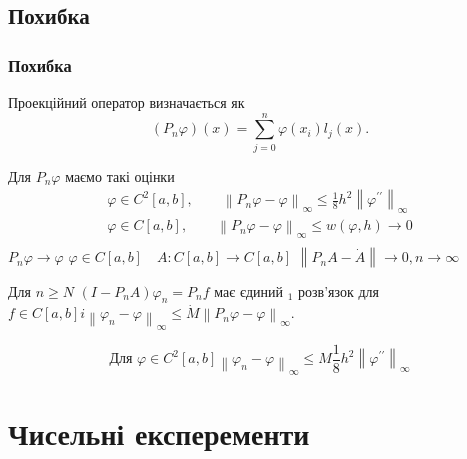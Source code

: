 \documentclass{beamer}
\numberwithin{equation}{section}
\begin{document}
	
	\subsection{Похибка}	
	\begin{frame}
		\frametitle{Похибка}
		
		Проекційний оператор визначається як 
		$$
		\left(P_{n} \varphi\right)(x)= \sum_{j=0}^{n} \varphi\left(x_{i}\right) l_{j}(x) .
		$$
		
		Для $P_{n} \varphi$ маємо такі оцінки 
		$$
		\begin{array}{l}
			\displaystyle
			\varphi \in C^{2}[a, b], \quad \quad \left\|P_{n} \varphi-\varphi\right\|_{\infty} \leq \frac{1}{8} h^{2}\left\|\varphi^{\prime \prime}\right\|_{\infty}  
			\\[0.3cm]
			
			\displaystyle
			\varphi \in C[a, b], \quad \quad \left\|P_{n} \varphi-\varphi\right\|_{\infty} \leq w(\varphi, h) \rightarrow 0
			\\[0.3cm]	
		\end{array}
		$$
		$P_{n} \varphi \rightarrow \varphi$ $\varphi \in C[a, b] \quad A: C[a, b] \rightarrow C[a, b]$  $\left\|P_{n} A-\dot{A}\right\| \rightarrow 0, n \rightarrow \infty$ 
		
		Для $n \geq N$ $\left(I-P_{n} A\right) \varphi_{n}=P_{n} f$ має єдиний $_{1}$ розв'язок для $f \in C[a, b] i\left\|\varphi_{n}-\varphi\right\|_{\infty} \leq \dot{M}\left\|P_{n} \varphi-\varphi\right\|_{\infty}$. 
		
		$$\text{Для } \varphi \in C^{2}[a, b]\left\|\varphi_{n}-\varphi\right\|_{\infty} \leq M \frac{1}{8} h^{2}\left\|\varphi^{\prime \prime}\right\|_{\infty}$$
	
		
		
		
		
		
	\end{frame}
	

	\section{Чисельні експеременти} 
\end{document}
